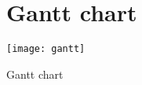 \chapter{Gantt chart}	
\begin{table}
\centering
\texttt{[image: gantt]} 
\caption{\label{tab:gantt}Gantt chart}
\end{table}